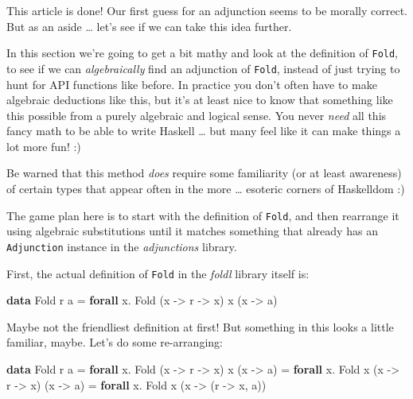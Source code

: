 \documentclass[]{article}
\newenvironment{Shaded}{}{}
\newcommand{\DataTypeTok}[1]{\textcolor[rgb]{0.56,0.13,0.00}{#1}}
\newcommand{\KeywordTok}[1]{\textcolor[rgb]{0.00,0.44,0.13}{\textbf{#1}}}
\newcommand{\NormalTok}[1]{#1}
\newcommand{\OperatorTok}[1]{\textcolor[rgb]{0.40,0.40,0.40}{#1}}
\newcommand{\OtherTok}[1]{\textcolor[rgb]{0.00,0.44,0.13}{#1}}
\begin{document}
This article is done! Our first guess for an adjunction seems to be morally
correct. But as an aside \ldots{} let's see if we can take this idea further.

In this section we're going to get a bit mathy and look at the definition of
\texttt{Fold}, to see if we can \emph{algebraically} find an adjunction of
\texttt{Fold}, instead of just trying to hunt for API functions like before. In
practice you don't often have to make algebraic deductions like this, but it's
at least nice to know that something like this possible from a purely algebraic
and logical sense. You never \emph{need} all this fancy math to be able to write
Haskell \ldots{} but many feel like it can make things a lot more fun! :)

Be warned that this method \emph{does} require some familiarity (or at least
awareness) of certain types that appear often in the more \ldots{} esoteric
corners of Haskelldom :)

The game plan here is to start with the definition of \texttt{Fold}, and then
rearrange it using algebraic substitutions until it matches something that
already has an \texttt{Adjunction} instance in the \emph{adjunctions} library.

First, the actual definition of \texttt{Fold} in the \emph{foldl} library itself
is:

\begin{Shaded}
\begin{Highlighting}[]
\KeywordTok{data} \DataTypeTok{Fold}\NormalTok{ r a }\OtherTok{=} \KeywordTok{forall}\NormalTok{ x}\OperatorTok{.} \DataTypeTok{Fold}\NormalTok{ (x }\OtherTok{{-}\textgreater{}}\NormalTok{ r }\OtherTok{{-}\textgreater{}}\NormalTok{ x) x (x }\OtherTok{{-}\textgreater{}}\NormalTok{ a)}
\end{Highlighting}
\end{Shaded}

Maybe not the friendliest definition at first! But something in this looks a
little familiar, maybe. Let's do some re-arranging:

\begin{Shaded}
\begin{Highlighting}[]
\KeywordTok{data} \DataTypeTok{Fold}\NormalTok{ r a }\OtherTok{=} \KeywordTok{forall}\NormalTok{ x}\OperatorTok{.} \DataTypeTok{Fold}\NormalTok{ (x }\OtherTok{{-}\textgreater{}}\NormalTok{ r }\OtherTok{{-}\textgreater{}}\NormalTok{ x) x (x }\OtherTok{{-}\textgreater{}}\NormalTok{ a)}
              \OtherTok{=} \KeywordTok{forall}\NormalTok{ x}\OperatorTok{.} \DataTypeTok{Fold}\NormalTok{ x (x }\OtherTok{{-}\textgreater{}}\NormalTok{ r }\OtherTok{{-}\textgreater{}}\NormalTok{ x) (x }\OtherTok{{-}\textgreater{}}\NormalTok{ a)}
              \OtherTok{=} \KeywordTok{forall}\NormalTok{ x}\OperatorTok{.} \DataTypeTok{Fold}\NormalTok{ x (x }\OtherTok{{-}\textgreater{}}\NormalTok{ (r }\OtherTok{{-}\textgreater{}}\NormalTok{ x, a))}
\end{Highlighting}
\end{Shaded}
\end{document}

